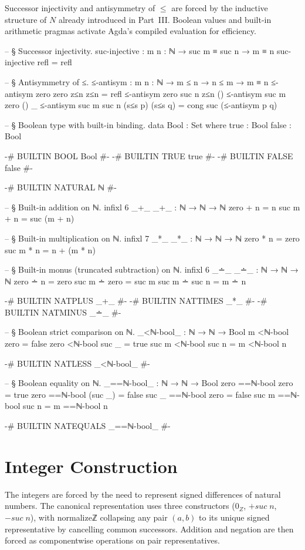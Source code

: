 \documentclass[11pt,a4paper]{book}
\def\mathrm#1{#1}%
\def\mathbb#1{#1}%
\def\texttt#1{#1}%
\begin{document}
Successor injectivity and antisymmetry of $\le$ are forced by the inductive
structure of $\mathbb{N}$ already introduced in Part~III. Boolean values and
built-in arithmetic pragmas activate Agda's compiled evaluation for efficiency.

\begin{code}
-- § Successor injectivity.
suc-injective : {m n : ℕ} → suc m ≡ suc n → m ≡ n
suc-injective refl = refl

-- § Antisymmetry of ≤.
≤-antisym : {m n : ℕ} → m ≤ n → n ≤ m → m ≡ n
≤-antisym {zero} {zero} z≤n z≤n = refl
≤-antisym {zero} {suc n} z≤n ()
≤-antisym {suc m} {zero} () _
≤-antisym {suc m} {suc n} (s≤s p) (s≤s q) = cong suc (≤-antisym p q)

-- § Boolean type with built-in binding.
data Bool : Set where
  true  : Bool
  false : Bool

{-# BUILTIN BOOL  Bool  #-}
{-# BUILTIN TRUE  true  #-}
{-# BUILTIN FALSE false #-}

{-# BUILTIN NATURAL ℕ #-}

-- § Built-in addition on ℕ.
infixl 6 _+_
_+_ : ℕ → ℕ → ℕ
zero  + n = n
suc m + n = suc (m + n)

-- § Built-in multiplication on ℕ.
infixl 7 _*_
_*_ : ℕ → ℕ → ℕ
zero  * n = zero
suc m * n = n + (m * n)

-- § Built-in monus (truncated subtraction) on ℕ.
infixl 6 _∸_
_∸_ : ℕ → ℕ → ℕ
zero  ∸ n     = zero
suc m ∸ zero  = suc m
suc m ∸ suc n = m ∸ n

{-# BUILTIN NATPLUS  _+_ #-}
{-# BUILTIN NATTIMES _*_ #-}
{-# BUILTIN NATMINUS _∸_ #-}

-- § Boolean strict comparison on ℕ.
_<ℕ-bool_ : ℕ → ℕ → Bool
m <ℕ-bool zero   = false
zero <ℕ-bool suc _ = true
suc m <ℕ-bool suc n = m <ℕ-bool n

{-# BUILTIN NATLESS _<ℕ-bool_ #-}

-- § Boolean equality on ℕ.
_==ℕ-bool_ : ℕ → ℕ → Bool
zero  ==ℕ-bool zero    = true
zero  ==ℕ-bool (suc _) = false
suc _ ==ℕ-bool zero    = false
suc m ==ℕ-bool suc n   = m ==ℕ-bool n

{-# BUILTIN NATEQUALS _==ℕ-bool_ #-}
\end{code}

\section{Integer Construction}

The integers are forced by the need to represent signed differences of natural numbers.
The canonical representation uses three constructors ($0_{\mathbb{Z}}$, $+\mathrm{suc}\;n$,
$-\mathrm{suc}\;n$), with \texttt{normalizeℤ} collapsing any pair $(a,b)$ to its unique
signed representative by cancelling common successors. Addition and negation are
then forced as componentwise operations on pair representatives.
\end{document}
